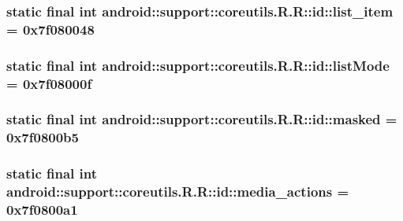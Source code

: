\hypertarget{classandroid_1_1support_1_1coreutils_1_1_r_1_1id_0474b4280e06dc3729d9ae0e6ec16113}{
\subsubsection[{list\_\-item}]{\setlength{\rightskip}{0pt plus 5cm}static final int android::support::coreutils.R.R::id::list\_\-item = 0x7f080048}}
\label{classandroid_1_1support_1_1coreutils_1_1_r_1_1id_0474b4280e06dc3729d9ae0e6ec16113}


\hypertarget{classandroid_1_1support_1_1coreutils_1_1_r_1_1id_bb13dbf1afa1c4fd3cf4f8e560e0073a}{
\subsubsection[{listMode}]{\setlength{\rightskip}{0pt plus 5cm}static final int android::support::coreutils.R.R::id::listMode = 0x7f08000f}}
\label{classandroid_1_1support_1_1coreutils_1_1_r_1_1id_bb13dbf1afa1c4fd3cf4f8e560e0073a}


\hypertarget{classandroid_1_1support_1_1coreutils_1_1_r_1_1id_306bad2344e09611c157cdfc0a7ed5e4}{
\subsubsection[{masked}]{\setlength{\rightskip}{0pt plus 5cm}static final int android::support::coreutils.R.R::id::masked = 0x7f0800b5}}
\label{classandroid_1_1support_1_1coreutils_1_1_r_1_1id_306bad2344e09611c157cdfc0a7ed5e4}


\hypertarget{classandroid_1_1support_1_1coreutils_1_1_r_1_1id_7d1fcbcc97bced94d3530f4e72bea2df}{
\subsubsection[{media\_\-actions}]{\setlength{\rightskip}{0pt plus 5cm}static final int android::support::coreutils.R.R::id::media\_\-actions = 0x7f0800a1}}
\label{classandroid_1_1support_1_1coreutils_1_1_r_1_1id_7d1fcbcc97bced94d3530f4e72bea2df}


